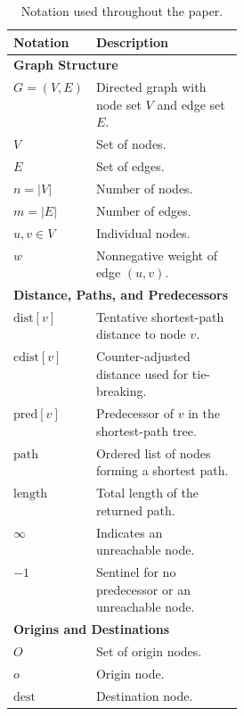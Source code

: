 \documentclass[ijoc,blindrev]{informs3} %
\begin{document}
 


\begin{table}[!htp]

\centering
\caption{Notation used throughout the paper.}
\label{tab:notations}

\begin{adjustbox}{
    max width=\textwidth,
    max totalheight=0.88\textheight,
    keepaspectratio,
    center
}
\begin{minipage}[t]{0.6\textwidth}
\scriptsize
\renewcommand{\arraystretch}{0.92}
\setlength{\tabcolsep}{3pt}

\begin{tabularx}{\linewidth}{@{}p{0.30\linewidth}X@{}}
\hline

\textbf{Notation} & \textbf{Description} \\
\hline

\multicolumn{2}{l}{\textbf{Graph Structure}} \\
\hline
$G=(V,E)$ & Directed graph with node set $V$ and edge set $E$. \\
$V$ & Set of nodes. \\
$E$ & Set of edges. \\
$n=|V|$ & Number of nodes. \\
$m=|E|$ & Number of edges. \\
$u,v\in V$ & Individual nodes. \\
$w$ & Nonnegative weight of edge $(u,v)$. \\
\hline

\multicolumn{2}{l}{\textbf{Distance, Paths, and Predecessors}} \\
\hline
$\text{dist}[v]$ & Tentative shortest-path distance to node $v$. \\
$\text{cdist}[v]$ & Counter-adjusted distance used for tie-breaking. \\
$\text{pred}[v]$ & Predecessor of $v$ in the shortest-path tree. \\
$\text{path}$ & Ordered list of nodes forming a shortest path. \\
$\text{length}$ & Total length of the returned path. \\
$\infty$ & Indicates an unreachable node. \\
$-1$ & Sentinel for no predecessor or an unreachable node. \\
\hline

\multicolumn{2}{l}{\textbf{Origins and Destinations}} \\
\hline
$O$ & Set of origin nodes. \\
$o$ & Origin node. \\
$\text{dest}$ & Destination node. \\
\hline


\end{tabularx}
\end{minipage}
\end{adjustbox}
\end{table}
\end{document}
